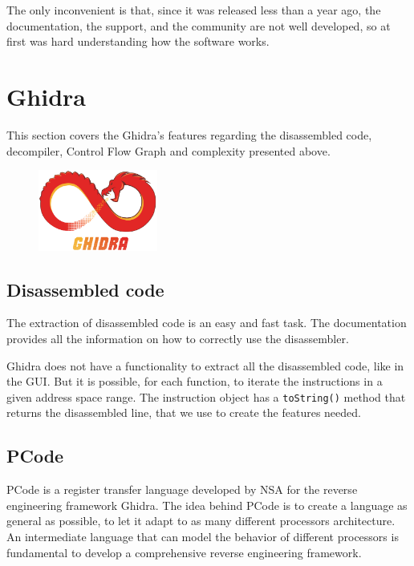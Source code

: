 The only inconvenient is that, since it was released less than a year ago, the documentation, the support, and the community are not well developed, so at first was hard understanding how the software works.
\section{Ghidra}

This section covers the Ghidra's features regarding the disassembled code, decompiler, Control Flow Graph and complexity presented above.
 
\begin{figure}[ht!]
	\centering
	\includegraphics[width=0.35\textwidth]{ghidra}
	
\end{figure}

\subsection{Disassembled code}

The extraction of disassembled code is an easy and fast task. The documentation provides all the information on how to correctly use the disassembler. 

Ghidra does not have a functionality to extract all the disassembled code, like in the GUI. But it is possible, for each function, to iterate the instructions in a given address space range. The instruction object has a \texttt{toString()} method that returns the disassembled line, that we use to create the features needed.

\subsection{PCode}
PCode is a register transfer language developed by NSA for the reverse engineering framework Ghidra. The idea behind PCode is to create a language as general as possible, to let it adapt to as many different processors architecture. An intermediate language that can model the behavior of different processors is fundamental to develop a comprehensive reverse engineering framework.

